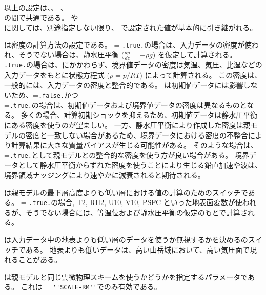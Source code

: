 以上の設定は、、
、\\
の間で共通である。
や \\
に関しては、別途指定しない限り、
で設定された値が基本的に引き継がれる。
%

は密度の計算方法の設定である。
 = \verb|.true.|の場合は、入力データの密度が使われ、そうでない場合は、静水圧平衡 ($\frac{dp}{dz}=-\rho g$) を仮定して計算される。
 = \verb|.true.|の場合は、にかかわらず、境界値データの密度は気温、気圧、比湿などの入力データをもとに状態方程式 ($\rho = p/RT$) によって計算される。
この密度は、一般的には、入力データの密度と整合的である。
 は初期値データには影響しないため、=\verb|.false.|かつ\\ =\verb|.true.|の場合は、初期値データおよび境界値データの密度は異なるものとなる。
多くの場合、計算初期ショックを抑えるため、初期値データは静水圧平衡にある密度を使うのが望ましい。
一方、静水圧平衡により作成した密度は親モデルの密度と一致しない場合があるため、境界データにおける密度の不整合により計算結果に大きな質量バイアスが生じる可能性がある。
そのような場合は、=\verb|.true.|として親モデルとの整合的な密度を使う方が良い場合がある。
境界データとして静水圧平衡からずれた密度を使うことにより生じる鉛直加速や波は、境界領域ナッジングにより速やかに減衰されると期待される。

は親モデルの最下層高度よりも低い層における値の計算のためのスイッチである。
 = \verb|.true.|の場合, T2, RH2, U10, V10, PSFC といった地表面変数が使われるが、そうでない場合には、等温位および静水圧平衡の仮定のもとで計算される。

は入力データ中の地表よりも低い層のデータを使うか無視するかを決めるのスイッチである。
地表よりも低いデータは、高い山岳域において、高い気圧面で現れることがある。


は親モデルと同じ雲微物理スキームを使うかどうかを指定するパラメータである。
これは = \verb|''SCALE-RM''|でのみ有効である。



